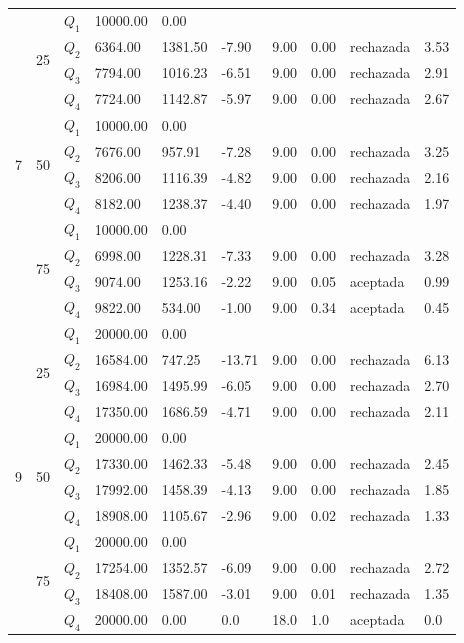\begin{table}[]
\begin{tabular}{|l|l|l|l|l|l|l|l|l|l|}
\multirow{12}{*}{7} & \multirow{4}{*}{25} & $Q_1$ & 10000.00 & 0.00 & \multicolumn{5}{l|}{} \\ \cline{3-10} 
 &  & $Q_2$ & 6364.00 & 1381.50 & -7.90 & 9.00 & 0.00 & rechazada & 3.53 \\ \cline{3-10} 
 &  & $Q_3$ & 7794.00 & 1016.23 & -6.51 & 9.00 & 0.00 & rechazada & 2.91 \\ \cline{3-10} 
 &  & $Q_4$ & 7724.00 & 1142.87 & -5.97 & 9.00 & 0.00 & rechazada & 2.67 \\ \cline{2-10} 
 & \multirow{4}{*}{50} & $Q_1$ & 10000.00 & 0.00 & \multicolumn{5}{l|}{} \\ \cline{3-10} 
 &  & $Q_2$ & 7676.00 & 957.91 & -7.28 & 9.00 & 0.00 & rechazada & 3.25 \\ \cline{3-10} 
 &  & $Q_3$ & 8206.00 & 1116.39 & -4.82 & 9.00 & 0.00 & rechazada & 2.16 \\ \cline{3-10} 
 &  & $Q_4$ & 8182.00 & 1238.37 & -4.40 & 9.00 & 0.00 & rechazada & 1.97 \\ \cline{2-10} 
 & \multirow{4}{*}{75} & $Q_1$ & 10000.00 & 0.00 & \multicolumn{5}{l|}{} \\ \cline{3-10} 
 &  & $Q_2$ & 6998.00 & 1228.31 & -7.33 & 9.00 & 0.00 & rechazada & 3.28 \\ \cline{3-10} 
 &  & $Q_3$ & 9074.00 & 1253.16 & -2.22 & 9.00 & 0.05 & aceptada & 0.99 \\ \cline{3-10} 
 &  & $Q_4$ & 9822.00 & 534.00 & -1.00 & 9.00 & 0.34 & aceptada & 0.45 \\ \hline
\multirow{12}{*}{9} & \multirow{4}{*}{25} & $Q_1$ & 20000.00 & 0.00 & \multicolumn{5}{l|}{} \\ \cline{3-10} 
 &  & $Q_2$ & 16584.00 & 747.25 & -13.71 & 9.00 & 0.00 & rechazada & 6.13 \\ \cline{3-10} 
 &  & $Q_3$ & 16984.00 & 1495.99 & -6.05 & 9.00 & 0.00 & rechazada & 2.70 \\ \cline{3-10} 
 &  & $Q_4$ & 17350.00 & 1686.59 & -4.71 & 9.00 & 0.00 & rechazada & 2.11 \\ \cline{2-10} 
 & \multirow{4}{*}{50} & $Q_1$ & 20000.00 & 0.00 & \multicolumn{5}{l|}{} \\ \cline{3-10} 
 &  & $Q_2$ & 17330.00 & 1462.33 & -5.48 & 9.00 & 0.00 & rechazada & 2.45 \\ \cline{3-10} 
 &  & $Q_3$ & 17992.00 & 1458.39 & -4.13 & 9.00 & 0.00 & rechazada & 1.85 \\ \cline{3-10} 
 &  & $Q_4$ & 18908.00 & 1105.67 & -2.96 & 9.00 & 0.02 & rechazada & 1.33 \\ \cline{2-10} 
 & \multirow{4}{*}{75} & $Q_1$ & 20000.00 & 0.00 & \multicolumn{5}{l|}{} \\ \cline{3-10} 
 &  & $Q_2$ & 17254.00 & 1352.57 & -6.09 & 9.00 & 0.00 & rechazada & 2.72 \\ \cline{3-10} 
 &  & $Q_3$ & 18408.00 & 1587.00 & -3.01 & 9.00 & 0.01 & rechazada & 1.35 \\ \cline{3-10} 
 &  & $Q_4$ & 20000.00 & 0.00 & 0.0 & 18.0 & 1.0 & aceptada & 0.0 \\ \hline
\end{tabular}
\end{table}


